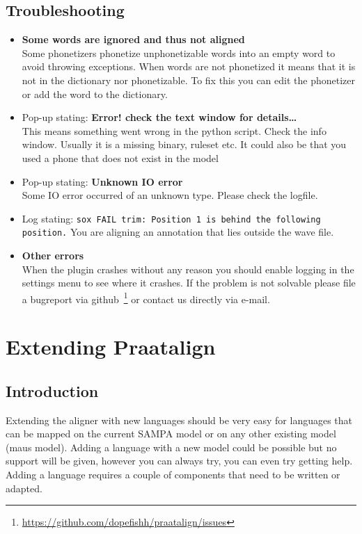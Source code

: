 \section{Troubleshooting}
\begin{itemize}
	\item \textbf{Some words are ignored and thus not aligned}\\
		Some phonetizers phonetize unphonetizable words into an empty word to avoid
		throwing exceptions. When words are not phonetized it means that it is not
		in the dictionary nor phonetizable. To fix this you can edit the phonetizer
		or add the word to the dictionary.
	\item Pop-up stating: \textbf{Error! check the text window for details\ldots}\\
		This means something went wrong in the python script. Check the info
		window. Usually it is a missing binary, ruleset etc. It could also be
		that you used a phone that does not exist in the model
	\item Pop-up stating: \textbf{Unknown IO error}\\
		Some IO error occurred of an unknown type. Please check the logfile.
	\item Log stating: \texttt{sox FAIL trim: Position 1 is behind the
		following position.}
		You are aligning an annotation that lies outside the wave file.
	\item \textbf{Other errors}\\
		When the plugin crashes without any reason you should enable logging in the
		settings menu to see where it crashes. If the problem is not solvable
		please file a bugreport via
		github~\footnote{\url{https://github.com/dopefishh/praatalign/issues}} or
		contact us directly via e-mail.
\end{itemize}

\chapter{Extending Praatalign}
\section{Introduction}
Extending the aligner with new languages should be very easy for languages that
can be mapped on the current SAMPA model or on any other existing model (maus
model).
Adding a language with a new model could be possible but no support will be
given, however you can always try, you can even try getting help. Adding a
language requires a couple of components that need to be written or adapted.

